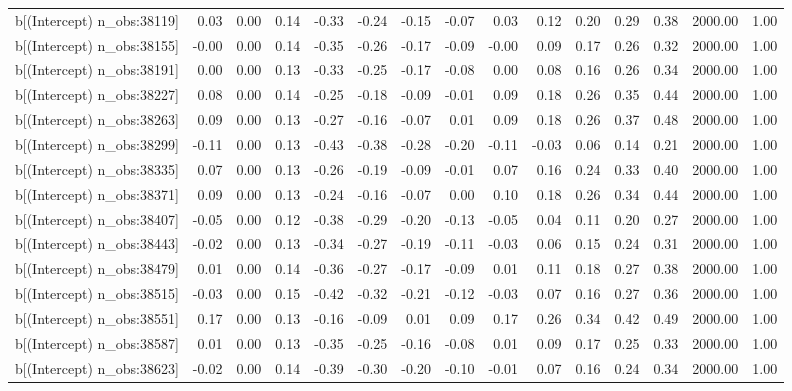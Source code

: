 \begin{table}[ht]
\begin{tabular}{rrrrrrrrrrrrrrr}
  b[(Intercept) n\_obs:38119] & 0.03 & 0.00 & 0.14 & -0.33 & -0.24 & -0.15 & -0.07 & 0.03 & 0.12 & 0.20 & 0.29 & 0.38 & 2000.00 & 1.00 \\ 
  b[(Intercept) n\_obs:38155] & -0.00 & 0.00 & 0.14 & -0.35 & -0.26 & -0.17 & -0.09 & -0.00 & 0.09 & 0.17 & 0.26 & 0.32 & 2000.00 & 1.00 \\ 
  b[(Intercept) n\_obs:38191] & 0.00 & 0.00 & 0.13 & -0.33 & -0.25 & -0.17 & -0.08 & 0.00 & 0.08 & 0.16 & 0.26 & 0.34 & 2000.00 & 1.00 \\ 
  b[(Intercept) n\_obs:38227] & 0.08 & 0.00 & 0.14 & -0.25 & -0.18 & -0.09 & -0.01 & 0.09 & 0.18 & 0.26 & 0.35 & 0.44 & 2000.00 & 1.00 \\ 
  b[(Intercept) n\_obs:38263] & 0.09 & 0.00 & 0.13 & -0.27 & -0.16 & -0.07 & 0.01 & 0.09 & 0.18 & 0.26 & 0.37 & 0.48 & 2000.00 & 1.00 \\ 
  b[(Intercept) n\_obs:38299] & -0.11 & 0.00 & 0.13 & -0.43 & -0.38 & -0.28 & -0.20 & -0.11 & -0.03 & 0.06 & 0.14 & 0.21 & 2000.00 & 1.00 \\ 
  b[(Intercept) n\_obs:38335] & 0.07 & 0.00 & 0.13 & -0.26 & -0.19 & -0.09 & -0.01 & 0.07 & 0.16 & 0.24 & 0.33 & 0.40 & 2000.00 & 1.00 \\ 
  b[(Intercept) n\_obs:38371] & 0.09 & 0.00 & 0.13 & -0.24 & -0.16 & -0.07 & 0.00 & 0.10 & 0.18 & 0.26 & 0.34 & 0.44 & 2000.00 & 1.00 \\ 
  b[(Intercept) n\_obs:38407] & -0.05 & 0.00 & 0.12 & -0.38 & -0.29 & -0.20 & -0.13 & -0.05 & 0.04 & 0.11 & 0.20 & 0.27 & 2000.00 & 1.00 \\ 
  b[(Intercept) n\_obs:38443] & -0.02 & 0.00 & 0.13 & -0.34 & -0.27 & -0.19 & -0.11 & -0.03 & 0.06 & 0.15 & 0.24 & 0.31 & 2000.00 & 1.00 \\ 
  b[(Intercept) n\_obs:38479] & 0.01 & 0.00 & 0.14 & -0.36 & -0.27 & -0.17 & -0.09 & 0.01 & 0.11 & 0.18 & 0.27 & 0.38 & 2000.00 & 1.00 \\ 
  b[(Intercept) n\_obs:38515] & -0.03 & 0.00 & 0.15 & -0.42 & -0.32 & -0.21 & -0.12 & -0.03 & 0.07 & 0.16 & 0.27 & 0.36 & 2000.00 & 1.00 \\ 
  b[(Intercept) n\_obs:38551] & 0.17 & 0.00 & 0.13 & -0.16 & -0.09 & 0.01 & 0.09 & 0.17 & 0.26 & 0.34 & 0.42 & 0.49 & 2000.00 & 1.00 \\ 
  b[(Intercept) n\_obs:38587] & 0.01 & 0.00 & 0.13 & -0.35 & -0.25 & -0.16 & -0.08 & 0.01 & 0.09 & 0.17 & 0.25 & 0.33 & 2000.00 & 1.00 \\ 
  b[(Intercept) n\_obs:38623] & -0.02 & 0.00 & 0.14 & -0.39 & -0.30 & -0.20 & -0.10 & -0.01 & 0.07 & 0.16 & 0.24 & 0.34 & 2000.00 & 1.00 \\ 

\end{tabular}
\end{table}
